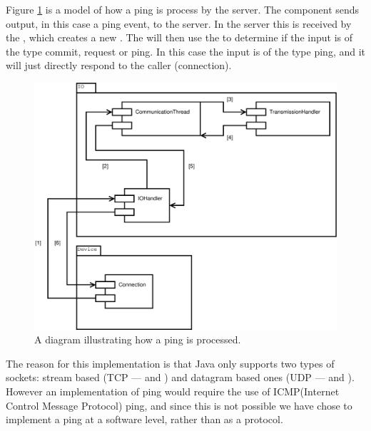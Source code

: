 Figure \ref{fig:IOPing} is a model of how a ping is process by the server. The  component sends output, in this case a ping event, to the server. In the server this is received by the , which creates a new \newline {}.
The  will then use the \newline {} to determine if the input is of the type commit, request or ping.
In this case the input is of the type ping, and it will just directly respond to the caller (connection).
\begin{figure}[htbp]
	\centering
		\includegraphics[scale=0.30]{images/ping}
	\caption{A diagram illustrating how a ping is processed.}
	\label{fig:IOPing}
\end{figure}

The reason for this implementation is that Java only supports two types of sockets: stream based (TCP ---  and ) and datagram based ones (UDP ---  \newline and )\cite{ICMP}\cite{javaNET}. However an implementation of ping would require the use of ICMP(Internet Control Message Protocol) ping, and since this is not possible we have chose to implement a ping at a software level, rather than as a protocol.


